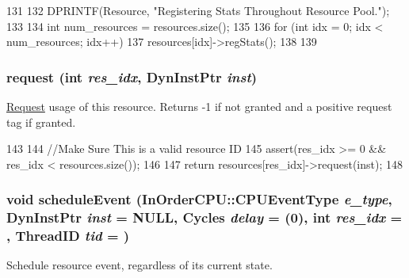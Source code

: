\begin{DoxyCode}
131 {
132     DPRINTF(Resource, "Registering Stats Throughout Resource Pool.\n");
133 
134     int num_resources = resources.size();
135 
136     for (int idx = 0; idx < num_resources; idx++) {
137         resources[idx]->regStats();
138     }
139 }
\end{DoxyCode}
\hypertarget{classResourcePool_a75ce2cd367c200399a9fd0839d951124}{
\subsubsection[{request}]{ request (int {\em res\_\-idx}, \/  {\bf DynInstPtr} {\em inst})}}
\label{classResourcePool_a75ce2cd367c200399a9fd0839d951124}
\hyperlink{classRequest}{Request} usage of this resource. Returns -\/1 if not granted and a positive request tag if granted. 


\begin{DoxyCode}
143 {
144     //Make Sure This is a valid resource ID
145     assert(res_idx >= 0 && res_idx < resources.size());
146 
147     return resources[res_idx]->request(inst);
148 }
\end{DoxyCode}
\hypertarget{classResourcePool_a2ab648fcabe96285d025deacd2175cbd}{
\subsubsection[{scheduleEvent}]{\setlength{\rightskip}{0pt plus 5cm}void scheduleEvent ({\bf InOrderCPU::CPUEventType} {\em e\_\-type}, \/  {\bf DynInstPtr} {\em inst} = {\ttfamily NULL}, \/  {\bf Cycles} {\em delay} = {(0)}, \/  int {\em res\_\-idx} = {}, \/  {\bf ThreadID} {\em tid} = {})}}
\label{classResourcePool_a2ab648fcabe96285d025deacd2175cbd}
Schedule resource event, regardless of its current state. 


